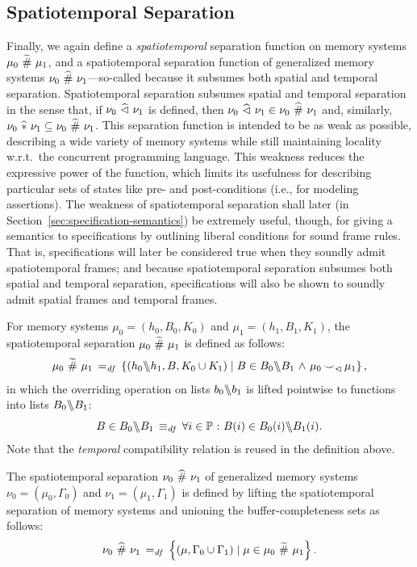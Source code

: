 \documentclass[11pt]{report}         %
\begin{document}
\subsection{Spatiotemporal Separation}
\label{sec:spatiotemporal-separation}

Finally, we again define a \emph{spatiotemporal} separation function on memory systems $\mu_0 \operatorname{\,\widetilde{\#}\,} \mu_1$, and a spatiotemporal separation function of generalized memory systems $\nu_0 \operatorname{\,\widehat{\#}\,} \nu_1$---so-called because it subsumes both spatial and temporal separation. Spatiotemporal separation subsumes spatial and temporal separation in the sense that, if $\nu_0 \operatorname{\,\widehat{\vartriangleleft}\,} \nu_1$ is defined, then $\nu_0 \operatorname{\,\widehat{\vartriangleleft}\,} \nu_1 \in \nu_0 \operatorname{\,\widehat{\#}\,} \nu_1$ and, similarly, $\nu_0 \operatorname{\,\widehat{\ast}\,} \nu_1 \subseteq \nu_0 \operatorname{\,\widehat{\#}\,} \nu_1$. This separation function is intended to be as weak as possible, describing a wide variety of memory systems while still maintaining locality w.r.t.\ the concurrent programming language. This weakness reduces the expressive power of the function, which limits its usefulness for describing particular sets of states like pre- and post-conditions (i.e., for modeling assertions). The weakness of spatiotemporal separation shall later (in Section~\ref{sec:specification-semantics}) be extremely useful, though, for giving a semantics to specifications by outlining liberal conditions for sound frame rules. That is, specifications will later be considered true when they soundly admit spatiotemporal frames; and because spatiotemporal separation subsumes both spatial and temporal separation, specifications will also be shown to soundly admit spatial frames and temporal frames. 

For memory systems $\mu_0 = (h_0,B_0,K_0)$ and $\mu_1 = (h_1,B_1,K_1)$, the spatiotemporal separation $\mu_0 \operatorname{\,\widetilde{\#}\,} \mu_1$ is defined as follows: \[ \mu_0 \operatorname{\,\widetilde{\#}\,} \mu_1 \operatorname{\;=_{\mathit{df}}\;} \left\lbrace (h_0 \backslash\!\!\backslash h_1, B, K_0 \cup K_1) \mid B \in B_0 \backslash\!\!\backslash B_1 \operatorname{\,\wedge\,} \mu_0 \operatorname{\smile}_\vartriangleleft \mu_1 \right\rbrace,\] in which the overriding operation on lists $b_0 \backslash\!\!\backslash b_1$ is lifted pointwise to functions into lists $B_0 \backslash\!\!\backslash B_1$: \[ B \in B_0 \backslash\!\!\backslash B_1 \operatorname{\;\equiv_{\mathit{df}}\;} \forall i \in \mathbb{P} \operatorname{\,:\,} B(i) \in B_0(i) \backslash\!\!\backslash B_1(i).\] Note that the \emph{temporal} compatibility relation is reused in the definition above. 

The spatiotemporal separation $\nu_0 \operatorname{\,\widehat{\#}\,} \nu_1$ of generalized memory systems $\nu_0 = (\mu_0,\Gamma_0)$ and $\nu_1 = (\mu_1,\Gamma_1)$ is defined by lifting the spatiotemporal separation of memory systems and unioning the buffer-completeness sets as follows: \[ \nu_0 \operatorname{\,\widehat{\#}\,} \nu_1 \operatorname{\;=_{\mathit{df}}\;} \left\lbrace (\mu,\Gamma_0 \cup \Gamma_1) \mid \mu \in \mu_0 \operatorname{\,\widetilde{\#}\,} \mu_1 \right\rbrace.\]
\end{document}
